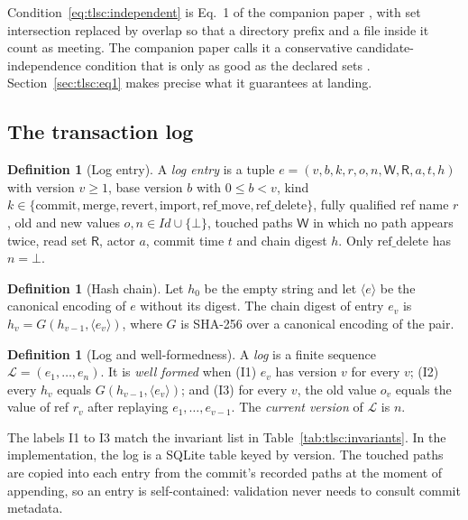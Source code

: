 \documentclass[11pt,letterpaper]{article}
\theoremstyle{definition}
\newtheorem{definition}[theorem]{Definition}
\theoremstyle{remark}
\newcommand{\R}{\mathsf{R}}
\newcommand{\W}{\mathsf{W}}
\newcommand{\Log}{\mathcal{L}}
\begin{document}
Condition~\eqref{eq:tlsc:independent} is Eq.~1 of the companion paper \cite{long2026inversion}, with set intersection replaced by overlap so that a directory prefix and a file inside it count as meeting. The companion paper calls it a conservative candidate-independence condition that is only as good as the declared sets \cite{long2026inversion}. Section~\ref{sec:tlsc:eq1} makes precise what it guarantees at landing.

\subsection{The transaction log}

\begin{definition}[Log entry]
\label{def:tlsc:entry}
A \emph{log entry} is a tuple $e=(v,b,k,r,o,n,\W,\R,a,t,h)$ with version $v\geq 1$, base version $b$ with $0\leq b<v$, kind $k\in\{\mathrm{commit},\mathrm{merge},\mathrm{revert},\mathrm{import},\mathrm{ref\_move},\mathrm{ref\_delete}\}$, fully qualified ref name $r$, old and new values $o,n\in\mathit{Id}\cup\{\bot\}$, touched paths $\W$ in which no path appears twice, read set $\R$, actor $a$, commit time $t$ and chain digest $h$. Only $\mathrm{ref\_delete}$ has $n=\bot$.
\end{definition}

\begin{definition}[Hash chain]
\label{def:tlsc:chain}
Let $h_0$ be the empty string and let $\langle e\rangle$ be the canonical encoding of $e$ without its digest. The chain digest of entry $e_v$ is $h_v=G(h_{v-1},\langle e_v\rangle)$, where $G$ is SHA-256 over a canonical encoding of the pair.
\end{definition}

\begin{definition}[Log and well-formedness]
\label{def:tlsc:log}
A \emph{log} is a finite sequence $\Log=(e_1,\dots,e_n)$. It is \emph{well formed} when (I1) $e_v$ has version $v$ for every $v$; (I2) every $h_v$ equals $G(h_{v-1},\langle e_v\rangle)$; and (I3) for every $v$, the old value $o_v$ equals the value of ref $r_v$ after replaying $e_1,\dots,e_{v-1}$. The \emph{current version} of $\Log$ is $n$.
\end{definition}

The labels I1 to I3 match the invariant list in Table~\ref{tab:tlsc:invariants}. In the implementation, the log is a SQLite table keyed by version. The touched paths are copied into each entry from the commit's recorded paths at the moment of appending, so an entry is self-contained: validation never needs to consult commit metadata.
\end{document}
